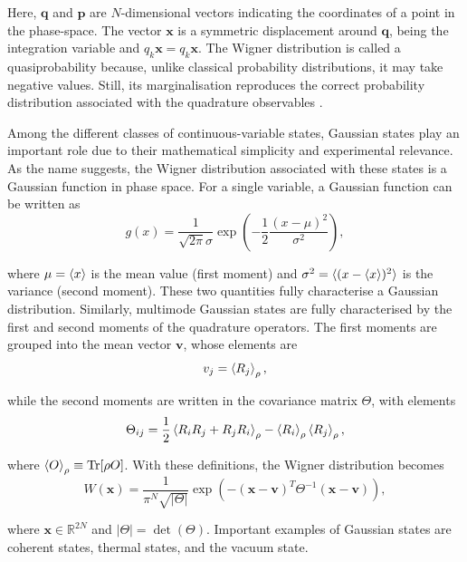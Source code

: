 \noindent Here, $\mathbf{q}$ and $\mathbf{p}$ are $N$-dimensional vectors indicating the coordinates of a point in the phase-space. The vector $\mathbf{x}$ is a symmetric displacement around $\mathbf{q}$, being the integration variable and ${q}_k \mathbf{x} = q_k \mathbf{x}$. The Wigner distribution is called a quasiprobability because, unlike classical probability distributions, it may take negative values. Still, its marginalisation reproduces the correct probability distribution associated with the quadrature observables \cite{gerardo-2014}.

Among the different classes of continuous-variable states, Gaussian states play an important role due to their mathematical simplicity and experimental relevance. As the name suggests, the Wigner distribution associated with these states is a Gaussian function in phase space. For a single variable, a Gaussian function can be written as
\begin{equation}
    g(x) = \frac{1}{\sqrt{2\pi} \sigma} \exp \left(-\frac{1}{2} \frac{(x - \mu)^2}{\sigma^2} \right),
\end{equation}

\noindent where $\mu = \braket{x}$ is the mean value (first moment) and $\sigma^2 = \braket{(x -  \braket{x})^2}$ is the variance (second moment). These two quantities fully characterise a Gaussian distribution. Similarly, multimode Gaussian states are fully characterised by the first and second moments of the quadrature operators. The first moments are grouped into the mean vector $\mathbf{v}$, whose elements are
\begin{equation}
    v_j = \braket{{R}_j}_\rho,
\end{equation}

\noindent while the second moments are written in the covariance matrix $\Theta$, with elements
\begin{equation}
    \Theta_{ij} = \frac{1}{2}\braket{{R}_i {R}_j + {R}_j {R}_i}_\rho - \braket{{R}_i}_\rho \braket{{R}_j}_\rho,
\end{equation}

\noindent where $\braket{{O}}_\rho \equiv \text{Tr}[\rho {O}]$. With these definitions, the Wigner distribution becomes
\begin{equation}
    W (\mathbf{x}) = \frac{1}{\pi^N \sqrt{|\Theta|}} \exp \left( -(\mathbf{x} - \mathbf{v})^T \Theta^{-1} (\mathbf{x} - \mathbf{v}) \right),
    \label{eq:wigner-dist}
\end{equation}

\noindent where $\mathbf{x} \in \mathbb{R}^{2N}$ and $|\Theta| = \det(\Theta)$. Important examples of Gaussian states are coherent states, thermal states, and the vacuum state.

